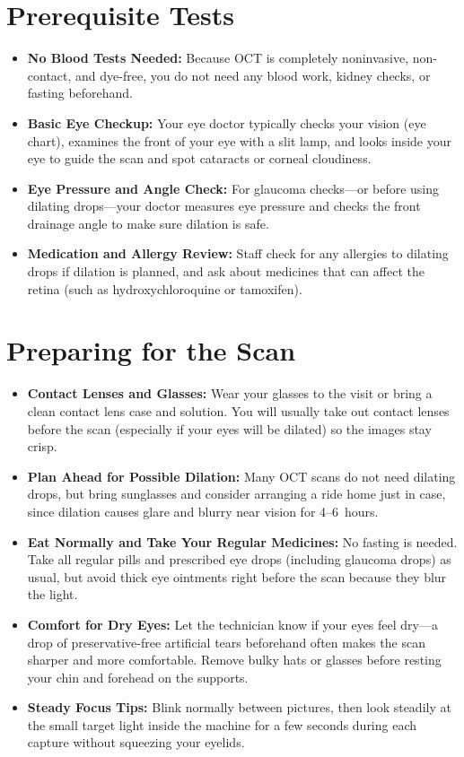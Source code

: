 \section{Prerequisite Tests}
\begin{itemize}
\item \textbf{No Blood Tests Needed:} Because OCT is completely noninvasive, non-contact, and dye-free, you do not need any blood work, kidney checks, or fasting beforehand.
\item \textbf{Basic Eye Checkup:} Your eye doctor typically checks your vision (eye chart), examines the front of your eye with a slit lamp, and looks inside your eye to guide the scan and spot cataracts or corneal cloudiness.
\item \textbf{Eye Pressure and Angle Check:} For glaucoma checks---or before using dilating drops---your doctor measures eye pressure and checks the front drainage angle to make sure dilation is safe.
\item \textbf{Medication and Allergy Review:} Staff check for any allergies to dilating drops if dilation is planned, and ask about medicines that can affect the retina (such as hydroxychloroquine or tamoxifen).
\end{itemize}

\section{Preparing for the Scan}
\begin{itemize}
\item \textbf{Contact Lenses and Glasses:} Wear your glasses to the visit or bring a clean contact lens case and solution. You will usually take out contact lenses before the scan (especially if your eyes will be dilated) so the images stay crisp.
\item \textbf{Plan Ahead for Possible Dilation:} Many OCT scans do not need dilating drops, but bring sunglasses and consider arranging a ride home just in case, since dilation causes glare and blurry near vision for 4--6~hours.
\item \textbf{Eat Normally and Take Your Regular Medicines:} No fasting is needed. Take all regular pills and prescribed eye drops (including glaucoma drops) as usual, but avoid thick eye ointments right before the scan because they blur the light.
\item \textbf{Comfort for Dry Eyes:} Let the technician know if your eyes feel dry---a drop of preservative-free artificial tears beforehand often makes the scan sharper and more comfortable. Remove bulky hats or glasses before resting your chin and forehead on the supports.
\item \textbf{Steady Focus Tips:} Blink normally between pictures, then look steadily at the small target light inside the machine for a few seconds during each capture without squeezing your eyelids.
\end{itemize}

